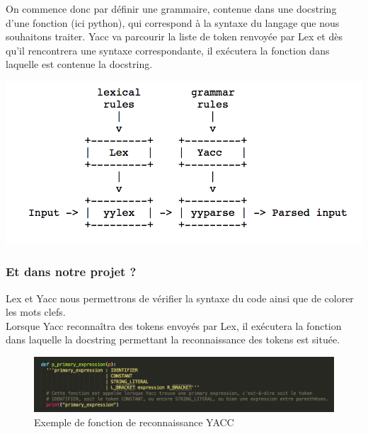 \documentclass[a4paper,12pt]{article}
\begin{document}
			On commence donc par définir une grammaire, contenue dans une docstring d'une fonction (ici python), qui correspond à 				la syntaxe du langage que nous souhaitons traiter. Yacc va parcourir la liste de token renvoyée par Lex et dès qu'il 				rencontrera une syntaxe correspondante, il exécutera la fonction dans laquelle est contenue la docstring. 
			\vspace{0.5cm}
			\begin{center}
				\includegraphics[scale=0.6]{images/schema_lex_yacc.png}
			\end{center}

		\subsubsection{Et dans notre projet ?}

			Lex et Yacc nous permettrons de vérifier la syntaxe du code ainsi que de colorer les mots clefs. \\
			Lorsque Yacc reconnaîtra des tokens envoyés par Lex, il exécutera la fonction dans laquelle la docstring permettant la 			reconnaissance des tokens est située.
			
			\begin{figure}[!h]
			
				\begin{center}
					\includegraphics[scale=0.6]{images/exemple_fct_yacc.png}
					\caption{Exemple de fonction de reconnaissance YACC}
				\end{center}
			
			\end{figure}
			
			
			
			
\end{document}
